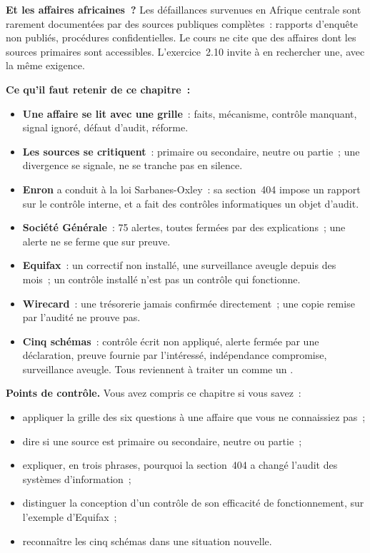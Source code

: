 \begin{boxinfo}
\textbf{Et les affaires africaines~?} Les défaillances survenues en
Afrique centrale sont rarement documentées par des sources publiques
complètes~: rapports d'enquête non publiés, procédures confidentielles. Le
cours ne cite que des affaires dont les sources primaires sont accessibles.
L'exercice~2.10 invite à en rechercher une, avec la même exigence.
\end{boxinfo}

\separateur

\begin{boxresume}
\textbf{Ce qu'il faut retenir de ce chapitre~:}
\begin{itemize}
    \item \textbf{Une affaire se lit avec une grille}~: faits, mécanisme,
          contrôle manquant, signal ignoré, défaut d'audit, réforme.
    \item \textbf{Les sources se critiquent}~: primaire ou secondaire,
          neutre ou partie~; une divergence se signale, ne se tranche pas en
          silence.
    \item \textbf{Enron} a conduit à la loi Sarbanes-Oxley~: sa section~404
          impose un rapport sur le contrôle interne, et a fait des
          contrôles informatiques un objet d'audit.
    \item \textbf{Société Générale}~: 75 alertes, toutes fermées par des
          explications~; une alerte ne se ferme que sur preuve.
    \item \textbf{Equifax}~: un correctif non installé, une surveillance
          aveugle depuis des mois~; un contrôle installé n'est pas un
          contrôle qui fonctionne.
    \item \textbf{Wirecard}~: une trésorerie jamais confirmée
          directement~; une copie remise par l'audité ne prouve pas.
    \item \textbf{Cinq schémas}~: contrôle écrit non appliqué, alerte
          fermée par une déclaration, preuve fournie par l'intéressé,
          indépendance compromise, surveillance aveugle. Tous reviennent à
          traiter un \NEK{} comme un \OUI{}.
\end{itemize}
\end{boxresume}

\begin{boxinfo}
\textbf{Points de contrôle.} Vous avez compris ce chapitre si vous savez~:
\begin{itemize}
    \item appliquer la grille des six questions à une affaire que vous ne
          connaissiez pas~;
    \item dire si une source est primaire ou secondaire, neutre ou partie~;
    \item expliquer, en trois phrases, pourquoi la section~404 a changé
          l'audit des systèmes d'information~;
    \item distinguer la conception d'un contrôle de son efficacité de
          fonctionnement, sur l'exemple d'Equifax~;
    \item reconnaître les cinq schémas dans une situation nouvelle.
\end{itemize}
\end{boxinfo}


